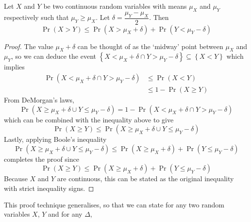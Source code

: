 \documentclass[11pt]{report} %
\begin{document}
\begin{theorem}
Let $X$ and $Y$ be two continuous random variables with means $\mu_{X}$ and $\mu_{Y}$ respectively such that $\mu_{Y} \geq \mu_{X}$. Let $\delta = \dfrac{\mu_{Y} - \mu_{X}}{2}$. Then
\begin{equation}
\operatorname{Pr}\left(X > Y\right) \leq \operatorname{Pr}\left(X > \mu_{X} + \delta\right) + \operatorname{Pr}\left(Y < \mu_{Y} - \delta\right)
\end{equation}
\end{theorem}
\begin{proof}
The value $\mu_{X} + \delta$ can be thought of as the `midway' point between $\mu_{X}$ and $\mu_{Y}$, so we can deduce the event $\left\{X < \mu_{X} + \delta \cap Y > \mu_{Y} - \delta\right\} \subseteq \left\{X <  Y\right\}$ which implies
\begin{align}
\operatorname{Pr}\left(X < \mu_{X} + \delta \cap Y > \mu_{Y} - \delta\right) &\leq \operatorname{Pr}\left(X < Y\right) \\
&\leq 1 - \operatorname{Pr}\left(X \geq Y\right)
\end{align}
From DeMorgan's laws,
\begin{equation}
\operatorname{Pr}\left(X \geq \mu_{X} + \delta \cup Y \leq \mu_{Y} - \delta\right) = 1 - \operatorname{Pr}\left(X < \mu_{X} + \delta \cap Y > \mu_{Y} - \delta\right)
\end{equation}
which can be combined with the inequality above to give
\begin{equation}
\operatorname{Pr}\left(X \geq Y\right) \leq \operatorname{Pr}\left(X \geq \mu_{X} + \delta \cup Y \leq \mu_{Y} - \delta\right)
\end{equation}
Lastly, applying Boole's inequality
\begin{equation}
\operatorname{Pr}\left(X \geq \mu_{X} + \delta \cup Y \leq \mu_{Y} - \delta\right) \leq \operatorname{Pr}\left(X \geq \mu_{X} + \delta\right) + \operatorname{Pr}\left(Y \leq \mu_{Y} - \delta\right)
\end{equation}
completes the proof since
\begin{equation}
\operatorname{Pr}\left(X \geq Y\right) \leq \operatorname{Pr}\left(X \geq \mu_{X} + \delta\right) + \operatorname{Pr}\left(Y \leq \mu_{Y} - \delta\right)
\end{equation}
Because $X$ and $Y$ are continuous, this can be stated as the original inequality with strict inequality signs.
\end{proof}
This proof technique generalises, so that we can state for any two random variables $X$, $Y$ and for any $\Delta$,
\end{document}
